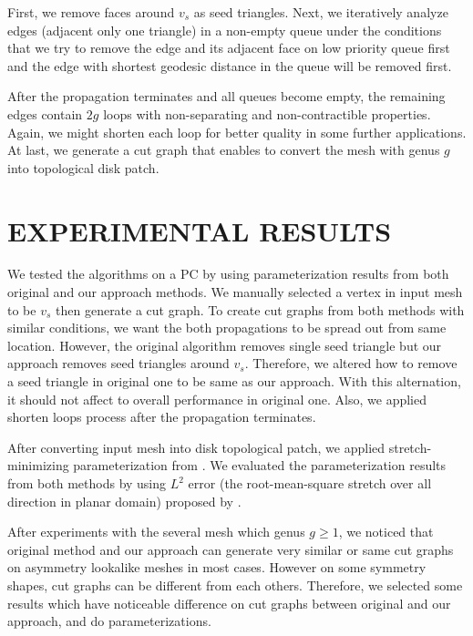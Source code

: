 \documentclass[a4paper,twoside]{article}
\begin{document}
First, we remove faces around $v_s$ as seed triangles. Next, we iteratively analyze edges (adjacent only one triangle) in a non-empty queue under the conditions that we try to remove the edge and its adjacent face on low priority queue first and the edge with shortest geodesic distance in the queue will be removed first.

After the propagation terminates and all queues become empty, the remaining edges contain $2g$ loops with non-separating and non-contractible properties. Again, we might shorten each loop for better quality in some further applications. At last, we generate a cut graph that enables to convert the mesh with genus $g$ into topological disk patch.


\section{\uppercase{Experimental Results}}
\label{sec:Experiment Results}
\noindent We tested the algorithms on a PC by using parameterization results from both original and our approach methods. We manually selected a vertex in input mesh to be $v_s$ then generate a cut graph. To create cut graphs from both methods with similar conditions, we want the both propagations to be spread out from same location. However, the original algorithm removes single seed triangle but our approach removes seed triangles around $v_s$. Therefore, we altered how to remove a seed triangle in original one to be same as our approach. With this alternation, it should not affect to overall performance in original one. Also, we applied shorten loops process after the propagation terminates.

After converting input mesh into disk topological patch, we applied stretch-minimizing parameterization from \cite{Yoshizawa_SMI04}.  We evaluated the parameterization results from both methods by using $L^2$ error (the root-mean-square stretch over all direction in planar domain) proposed by \cite{Sander:2001:TMP:383259.383307,Sander:2002:SP:581896.581909}.  

After experiments with the several mesh which genus $g \geq 1$, we noticed that original method and our approach can generate very similar or same cut graphs on asymmetry lookalike meshes in most cases. However on some symmetry shapes, cut graphs can be different from each others. Therefore, we selected some results which have noticeable difference on cut graphs between original and our approach, and do parameterizations.
\end{document}
